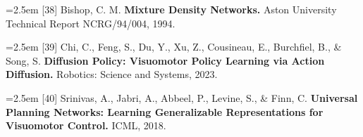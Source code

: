 \documentclass[11pt]{article}
\begin{document}
\noindent\hangindent=2.5em [38] Bishop, C. M. \textbf{Mixture Density Networks.} Aston University Technical Report NCRG/94/004, 1994.\par

\noindent\hangindent=2.5em [39] Chi, C., Feng, S., Du, Y., Xu, Z., Cousineau, E., Burchfiel, B., \& Song, S. \textbf{Diffusion Policy: Visuomotor Policy Learning via Action Diffusion.} Robotics: Science and Systems, 2023.\par

\noindent\hangindent=2.5em [40] Srinivas, A., Jabri, A., Abbeel, P., Levine, S., \& Finn, C. \textbf{Universal Planning Networks: Learning Generalizable Representations for Visuomotor Control.} ICML, 2018.\par
\end{document}
